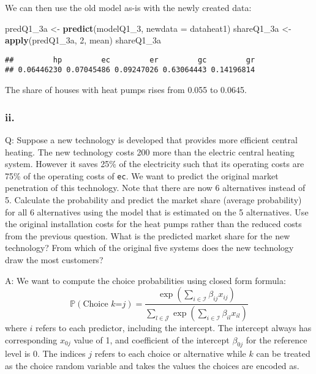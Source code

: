 \documentclass[
]{article}
\newenvironment{Shaded}{\begin{snugshade}}{\end{snugshade}}
\newcommand{\DataTypeTok}[1]{\textcolor[rgb]{0.13,0.29,0.53}{#1}}
\newcommand{\DecValTok}[1]{\textcolor[rgb]{0.00,0.00,0.81}{#1}}
\newcommand{\KeywordTok}[1]{\textcolor[rgb]{0.13,0.29,0.53}{\textbf{#1}}}
\newcommand{\NormalTok}[1]{#1}
\newcommand{\StringTok}[1]{\textcolor[rgb]{0.31,0.60,0.02}{#1}}
\begin{document}

We can then use the old model as-is with the newly created data:

\begin{Shaded}
\begin{Highlighting}[]
\NormalTok{predQ1_3a <-}\StringTok{ }\KeywordTok{predict}\NormalTok{(modelQ1_}\DecValTok{3}\NormalTok{, }\DataTypeTok{newdata =}\NormalTok{ dataheat1)}
\NormalTok{shareQ1_3a <-}\StringTok{ }\KeywordTok{apply}\NormalTok{(predQ1_3a, }\DecValTok{2}\NormalTok{, mean)}
\NormalTok{shareQ1_3a}
\end{Highlighting}
\end{Shaded}

\begin{verbatim}
##         hp         ec         er         gc         gr 
## 0.06446230 0.07045486 0.09247026 0.63064443 0.14196814
\end{verbatim}

The share of houses with heat pumps rises from 0.055 to 0.0645.

\hypertarget{ii.-3}{%
\subsubsection{ii.}\label{ii.-3}}

Q: Suppose a new technology is developed that provides more efficient
central heating. The new technology costs 200 more than the electric
central heating system. However it saves 25\% of the electricity such
that its operating costs are 75\% of the operating costs of \texttt{ec}.
We want to predict the original market penetration of this technology.
Note that there are now 6 alternatives instead of 5. Calculate the
probability and predict the market share (average probability) for all 6
alternatives using the model that is estimated on the 5 alternatives.
Use the original installation costs for the heat pumps rather than the
reduced costs from the previous question. What is the predicted market
share for the new technology? From which of the original five systems
does the new technology draw the most customers?


A: We want to compute the choice probabilities using closed form
formula: \begin{equation*}
\mathbb{P}\left(\text{Choice $k$=$j$}\right)=\frac{\exp\left(\sum_{i\in \mathcal{I}}\beta_{ij}x_{ij}\right)}{\sum_{l\in\mathcal{J}}\exp\left(\sum_{i\in \mathcal{I}}\beta_{il}x_{il}\right)}
\end{equation*} where \(i\) refers to each predictor, including the
intercept. The intercept always has corresponding \(x_{0j}\) value of 1,
and coefficient of the intercept \(\beta_{0j}\) for the reference level
is 0. The indices \(j\) refers to each choice or alternative while \(k\)
can be treated as the choice random variable and takes the values the
choices are encoded as.
\end{document}
